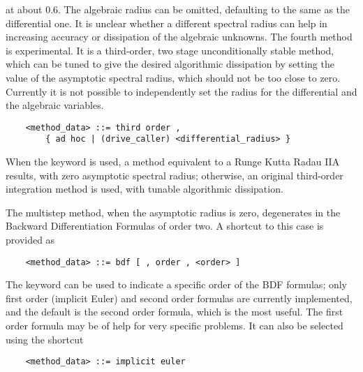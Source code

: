 at about 0.6.
The algebraic radius can be omitted, defaulting to the same 
as the differential one.
It is unclear whether a different spectral radius can help in increasing
accuracy or dissipation of the algebraic unknowns.
The fourth method is experimental. It is a third-order,
two stage unconditionally stable method, which can be tuned to give 
the desired algorithmic dissipation by setting the value 
of the asymptotic spectral radius, which should not be 
too close to zero.
Currently it is not possible to independently set the radius 
for the differential and the algebraic variables.
\begin{verbatim}
    <method_data> ::= third order ,
        { ad hoc | (drive_caller) <differential_radius> }
\end{verbatim}
When the keyword  is used, a method equivalent
to a Runge Kutta Radau IIA results, with zero asymptotic
spectral radius; otherwise, an original third-order
integration method is used, with tunable algorithmic dissipation.

\noindent
The multistep method, when the asymptotic radius is zero, degenerates
in the Backward Differentiation Formulas of order two.
A shortcut to this case is provided as
\begin{verbatim}
    <method_data> ::= bdf [ , order , <order> ]
\end{verbatim}
The keyword  can be used to indicate a specific order
of the BDF formulas; only first order (implicit Euler) and 
second order formulas are currently implemented, and the default
is the second order formula, which is the most useful.
The first order formula may be of help for very specific problems.
It can also be selected using the shortcut
\begin{verbatim}
    <method_data> ::= implicit euler
\end{verbatim}

